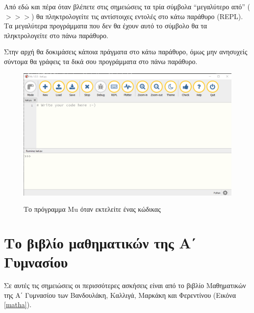 Από εδώ και πέρα όταν βλέπετε στις σημειώσεις τα τρία σύμβολα ``μεγαλύτερο από'' ($>>>$) θα πληκτρολογείτε τις αντίστοιχες εντολές στο κάτω παράθυρο (REPL). Τα μεγαλύτερα προγράμματα που δεν θα έχουν αυτό το σύμβολο θα τα πληκτρολογείτε στο πάνω παράθυρο.



Στην αρχή θα δοκιμάσεις κάποια πράγματα στο κάτω παράθυρο, όμως μην ανησυχείς σύντομα θα γράφεις τα δικά σου προγράμματα στο πάνω παράθυρο.

\begin{figure}
\includegraphics[width=\textwidth]{mu2.png}
\label{Mu2}
\caption{Το πρόγραμμα Mu όταν εκτελείτε ένας κώδικας}
\end{figure}

\section{Το βιβλίο μαθηματικών της Α΄ Γυμνασίου}
Σε αυτές τις σημειώσεις οι περισσότερες ασκήσεις είναι από το βιβλίο Μαθηματικών της Α΄ Γυμνασίου των Βανδουλάκη, Καλλιγά, Μαρκάκη και Φερεντίνου (Εικόνα \ref{matha}).


